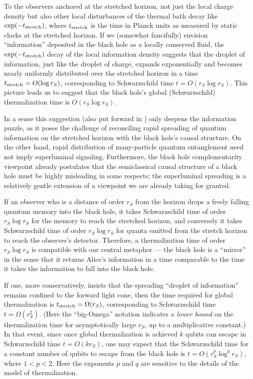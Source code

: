 \documentclass[11pt]{article}
\begin{document}
To the observers anchored at the stretched horizon, not just the local charge density but also other local disturbances of the thermal bath decay like $\exp(-t_{\rm stretch})$, where $t_{\rm stretch}$ is the time in Planck units as measured by static clocks at the stretched horizon. If we (somewhat fancifully) envision ``information'' deposited in the black hole as a locally conserved fluid, the $\exp(-t_{\rm stretch})$ decay of the local information density suggests that the droplet of information, just like the droplet of charge, expands exponentially and becomes nearly uniformly distributed over the stretched horizon in a time $t_{\rm stretch}=O(\log r_S)$, corresponding to Schwarzschild time $t=O(r_S\log r_S)$. This picture leads us to suggest that the black hole's global (Schwarzschild) thermalization time is $O(r_S\log r_S)$. 

In a sense this suggestion (also put forward in \cite{susskind-book}) only deepens the information puzzle, as it poses the challenge of reconciling rapid spreading of quantum information on the stretched horizon with the black hole's causal structure. On the other hand, rapid distribution of many-particle quantum entanglement need not imply superluminal signaling. Furthermore, the black hole complementarity viewpoint already postulates that the semiclassical causal structure of a black hole must be highly misleading in some respects; the superluminal spreading is a relatively gentle extension of a viewpoint we are already taking for granted.

If an observer who is a distance of order $r_S$ from the horizon drops a freely falling quantum memory into the black hole, it takes Schwarzschild time of order $r_S\log r_S$ for the memory to reach the stretched horizon, and conversely it takes Schwarzschild time of order $r_S\log r_S$ for quanta emitted from the stretch horizon to reach the observer's detector. Therefore, a thermalization time of order $r_S\log r_S$ is compatible with our central metaphor --- the black hole is a ``mirror'' in the sense that it returns Alice's information in a time comparable to the time it takes the information to fall into the black hole.

If one, more conservatively, insists that the spreading ``droplet of information'' remains confined to the forward light cone, then the time required for global thermalization is $t_{\rm stretch}=\Omega(r_S)$, corresponding to Schwarzschild time $t=\Omega(r_S^2)$. (Here the ``big-Omega'' notation indicates a {\em lower bound} on the thermalization time for asymptotically large $r_S$, up to a multiplicative constant.) In that event, since once global thermalization is achieved $k$ qubits can escape in Schwarzschild time $t=O(kr_S)$, one may expect that the Schwarzschild time for a constant number of qubits to escape from the black hole is $t=O(r_S^p\log^q r_S)$, where $1 < p < 2$. Here the exponents $p$ and $q$ are sensitive to the details of the model of thermalization. 
\end{document}
